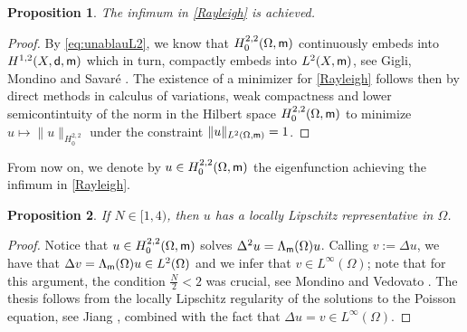 \documentclass[11pt, reqno]{amsart}
\newtheorem{proposition}{Proposition}[section]
\numberwithin{equation}{section}
\begin{document}
	\begin{proposition}\label{prop-inf-min} The infimum in \eqref{Rayleigh} is achieved. 
	\end{proposition}
	
	\begin{proof}
				By \eqref{eq:unablauL2}, we know that  $H^{2,2}_0(\Omega,{\sf m})$ continuously embeds  into $H^{ 1,2}(X,{\sf d},{\sf m})$ which in turn, compactly embeds into $L^2(X,{\sf m})$, see Gigli,  Mondino and Savaré \cite{GMS}.  
				The existence of a minimizer for \eqref{Rayleigh} follows then by direct methods in calculus of variations, weak compactness and lower semicontintuity of the norm in the Hilbert space $H^{2,2}_0(\Omega,{\sf m})$ to minimize $u\mapsto \|u\|_{H^{2,2}_0}$ under the constraint $\|u\|_{L^2(\Omega,{\sf m})}=1$.
	\end{proof}
	From now on, we denote by $u\in H^{2,2}_0(\Omega,{\sf m})$  the eigenfunction achieving the infimum in \eqref{Rayleigh}.
	
	\begin{proposition}\label{prop-lipschitz}
		If $N\in [1,4)$, then $u$ has a locally Lipschitz representative in $\Omega$. 
	\end{proposition}
	\begin{proof}
		Notice that $u\in H^{2,2}_0(\Omega,{\sf m})$ solves $\Delta^2 u=\Lambda_{\sf m}(\Omega) u$. Calling $v:=\Delta u$, we have that $\Delta v= \Lambda_{\sf m}(\Omega) u\in L^2(\Omega)$ and  we infer that $v\in L^\infty(\Omega)$; note that for this argument, the condition $\frac{N}{2}<2$ was crucial, see Mondino and Vedovato \cite[Theorem 5.1]{MV-CVPDE}. The thesis follows from  the locally Lipschitz  regularity of the solutions to the Poisson equation, see Jiang \cite[Theorem 1.2]{Jiang}, combined with the fact that $\Delta u=v\in L^\infty(\Omega)$.
	\end{proof}
	
\end{document}
